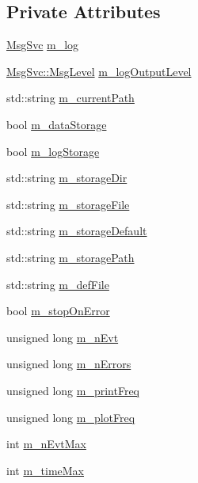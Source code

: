 \subsection*{Private Attributes}
\begin{DoxyCompactItemize}
\item 
\hyperlink{classMsgSvc}{MsgSvc} \hyperlink{classOptions_a80d2caed71dd935c104f0133504251e9}{m\_\-log}
\item 
\hyperlink{classMsgSvc_ae671eb7301996cd049d2da8a65925926}{MsgSvc::MsgLevel} \hyperlink{classOptions_a9ecfefe6bf44ff519369f38eb5c8147a}{m\_\-logOutputLevel}
\item 
std::string \hyperlink{classOptions_a9d82ad17fc1fd2315fc8a9e8d0d34f33}{m\_\-currentPath}
\item 
bool \hyperlink{classOptions_a244898bb30c9f716bdc335b4d85d1dfb}{m\_\-dataStorage}
\item 
bool \hyperlink{classOptions_ab7ffad5110df714233470725ef98be6e}{m\_\-logStorage}
\item 
std::string \hyperlink{classOptions_a88d9ed92fceb1c91e4df59bc1f81ab3b}{m\_\-storageDir}
\item 
std::string \hyperlink{classOptions_a4d952db4e93d3aae6db86d89faa3677a}{m\_\-storageFile}
\item 
std::string \hyperlink{classOptions_ab077e872fd03f7bf64f3a354d0c4a2f5}{m\_\-storageDefault}
\item 
std::string \hyperlink{classOptions_ad125e827cb30bc9b63875ec45b31ef5e}{m\_\-storagePath}
\item 
std::string \hyperlink{classOptions_a59ff5f2cab2490fb529367de13a2321a}{m\_\-defFile}
\item 
bool \hyperlink{classOptions_a879c2741a290595adb3f74633f3a3987}{m\_\-stopOnError}
\item 
unsigned long \hyperlink{classOptions_a5e3bb1f2dfc4bf10cab08a33253cc4db}{m\_\-nEvt}
\item 
unsigned long \hyperlink{classOptions_ae6460776ac3433103d88729a6811fc56}{m\_\-nErrors}
\item 
unsigned long \hyperlink{classOptions_acf8f96cbc3245ec4b3b47bd3bfa0d742}{m\_\-printFreq}
\item 
unsigned long \hyperlink{classOptions_aa7f7161bc67732b310937afb137657a0}{m\_\-plotFreq}
\item 
int \hyperlink{classOptions_a825a47258257937a8caa902f5fff7e8a}{m\_\-nEvtMax}
\item 
int \hyperlink{classOptions_a2584abb6745a082f73e2917732cd00e1}{m\_\-timeMax}
\item 

\end{DoxyCompactItemize}
